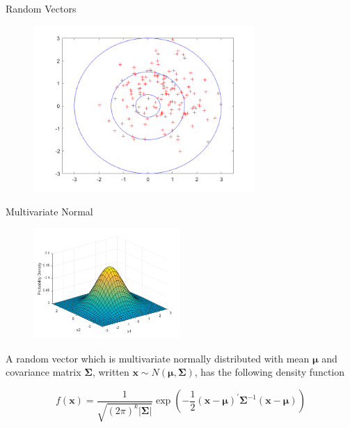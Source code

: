 \documentclass[11pt, xcolor={dvipsnames}, hyperref={colorlinks, allcolors=Blue}]{beamer}
\newcommand{\x}{\mathbf{x}}
\begin{document}
\begin{frame}{Random Vectors}

\begin{figure}
	\centering
	\includegraphics[width=0.75\textwidth]{bullseye.png}
\end{figure}
\end{frame}

\begin{frame}{Multivariate Normal}

\begin{figure}
	\centering
	\includegraphics[width=0.5\textwidth]{MVN.png}
\end{figure}


A random vector which is multivariate normally distributed  with mean $\mathbf{\mu}$ and covariance matrix $\mathbf{\Sigma}$, written $\x \sim N(\mathbf{\mu}, \mathbf{\Sigma})$, has the following density function\bigskip

\[f(\x) = \frac{1}{\sqrt{(2\pi)^k |\mathbf{\Sigma}|}} \exp \left ( -\frac{1}{2}(\x - \mathbf{\mu})^\prime \mathbf{\Sigma}^{-1}(\x - \mathbf{\mu})  \right )\]

\end{frame}
\end{document}
